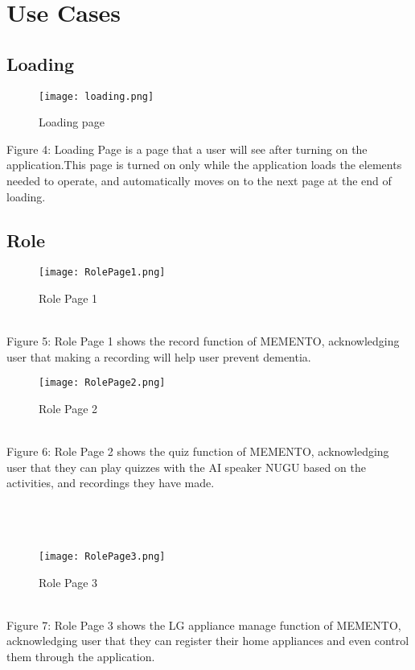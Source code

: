 \documentclass[conference]{IEEEtran}
\begin{document}
\section{Use Cases}
\subsection{Loading}
\begin{figure}[h]
\centerline{\texttt{[image: loading.png]}}
\caption{Loading page}
\label{fig}
\end{figure}
Figure 4: Loading Page is a page that a user will see after turning on the application.This page is turned on only while the application loads the elements needed to operate, and automatically moves on to the next page at the end of loading.\\

\clearpage
\subsection{Role}
\begin{figure}[h]
\centerline{\texttt{[image: RolePage1.png]}}
\caption{Role Page 1}
\label{fig}
\end{figure}
\\
Figure 5: Role Page 1 shows the record function of MEMENTO, acknowledging user that making a recording will help user prevent dementia.

\begin{figure}[h]
\centerline{\texttt{[image: RolePage2.png]}}
\caption{Role Page 2}
\label{fig}
\end{figure}
\\
Figure 6: Role Page 2 shows the quiz function of MEMENTO, acknowledging user that they can play quizzes with the AI speaker NUGU based on the activities, and recordings they have made.
\\\\\\\\
\begin{figure}[h]
\centerline{\texttt{[image: RolePage3.png]}}
\caption{Role Page 3}
\label{fig}
\end{figure}
\\
\indent Figure 7: Role Page 3 shows the LG appliance manage function of MEMENTO, acknowledging user that they can register their home appliances and even control them through the application.
\end{document}
